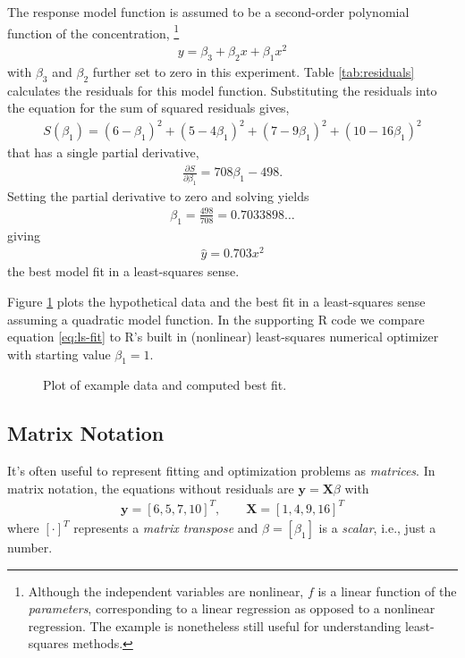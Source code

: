 \documentclass[11pt,a4paper]{article}
\begin{document}
The response model function is assumed to be a second-order polynomial
function of the concentration,%
\footnote{Although the independent variables are nonlinear, 
\(f\) is a linear function of the \emph{parameters}, 
corresponding to a linear regression as opposed to a nonlinear regression. 
The example is nonetheless still useful for understanding least-squares methods.}
\begin{align}
y = \beta_{3} + \beta_{2}x + \beta_{1}x^{2}
\end{align}
with \(\beta_{3}\) and \(\beta_{2}\) further set to zero in this
experiment. Table \ref{tab:residuals} calculates the residuals for this model function.
Substituting the residuals into the equation for the sum of squared
residuals gives,
\begin{align}
S\left( \beta_{1} \right) = \left( 6 - \beta_{1} \right)^{2} + \left( 5 - 4\beta_{1} \right)^{2} + \left( 7 - 9\beta_{1} \right)^{2} + \left( 10 - 16\beta_{1} \right)^{2}
\end{align}
that has a single partial derivative,
\begin{align}
\frac{\partial S}{\partial\beta_{1}} = 708\beta_{1} - 498.
\end{align}
Setting the partial derivative to zero and solving yields
\begin{align}
\beta_{1} = \frac{498}{708} = 0.7033898\ldots
\end{align}
giving
\begin{align}\label{eq:ls-fit}
\widehat{y} = 0.703x^{2}
\end{align}
the best model fit in a least-squares sense.

Figure \ref{fig:ls-fit} plots the hypothetical data and the best fit in a least-squares 
sense assuming a quadratic model function. 
In the supporting R code we compare equation \ref{eq:ls-fit} to R's built in (nonlinear) least-squares
numerical optimizer with starting value \(\beta_{1} = 1\).

\begin{figure}[h!]
\centering

\caption{%
Plot of example data and computed best fit.
}
\label{fig:ls-fit}
\end{figure}

\subsection{Matrix Notation}

It's often useful to represent fitting and optimization problems as \emph{matrices}. 
In matrix notation, 
the equations without residuals are
\(\boldsymbol{y} = \boldsymbol{X}\beta\) with
\begin{align}
\boldsymbol{y} = [6,5,7,10]^{T},\qquad \boldsymbol{X}=[1,4,9,16]^{T}
\end{align}
where \([\cdot]^{T}\) represents a \emph{matrix transpose} 
and \(\beta = [\beta_{1}]\) is a \emph{scalar}, i.e., just a number.
\end{document}
